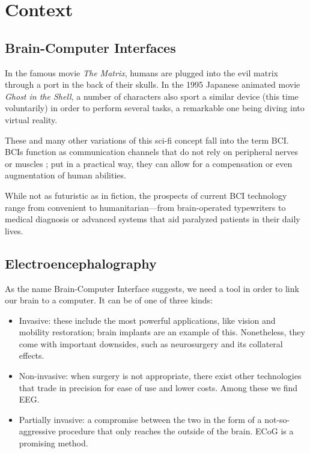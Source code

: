 \chapter{Context}\label{ch:context}

\section{Brain-Computer Interfaces}

	In the famous movie \textit{The Matrix}, humans are plugged into the evil matrix through a port in the back of their skulls. In the 1995 Japanese animated movie \textit{Ghost in the Shell}, a number of characters also sport a similar device (this time voluntarily) in order to perform several tasks, a remarkable one being diving into virtual reality.

	These and many other variations of this sci-fi concept fall into the term \ac{BCI}. \acs{BCI}s function as communication channels that do not rely on peripheral nerves or muscles \cite{bcidef}; put in a practical way, they can allow for a compensation or even augmentation of human abilities.

	While not as futuristic as in fiction, the prospects of current \acs{BCI} technology range from convenient to humanitarian---from brain-operated typewriters to medical diagnosis or advanced systems that aid paralyzed patients in their daily lives.

\section{Electroencephalography}

	As the name Brain-Computer Interface suggests, we need a tool in order to link our brain to a computer. It can be of one of three kinds:

	\begin{itemize}

		\item
		Invasive: these include the most powerful applications, like vision and mobility restoration; brain implants are an example of this. Nonetheless, they come with important downsides, such as neurosurgery and its collateral effects.
		\item
		Non-invasive: when surgery is not appropriate, there exist other technologies that trade in precision for ease of use and lower costs. Among these we find \ac{EEG}.
		\item
		Partially invasive: a compromise between the two in the form of a not-so-aggressive procedure that only reaches the outside of the brain. \ac{ECoG} is a promising method.

	\end{itemize}

